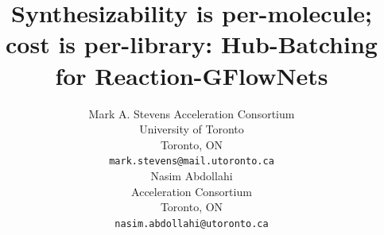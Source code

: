 \documentclass{article}
\title{Synthesizability is per-molecule; cost is per-library: Hub-Batching for Reaction-GFlowNets}
\author{%
  Mark A. Stevens
  Acceleration Consortium\\
  University of Toronto\\
  Toronto, ON \\
  \texttt{mark.stevens@mail.utoronto.ca} \\
  \And
  Nasim Abdollahi \\
  Acceleration Consortium \\
  Toronto, ON \\
  \texttt{nasim.abdollahi@utoronto.ca} \\
}
\newcommand{\checkval}[1]{\textcolor{blue}{#1}}
\begin{document}
\maketitle

\begin{abstract}
%

\end{abstract}
\end{document}
